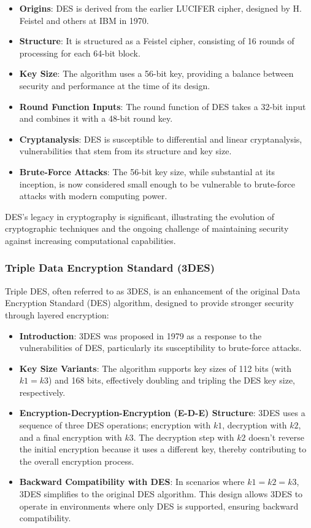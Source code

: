 \documentclass[12pt]{article}
\begin{document}
\begin{itemize}
    \item \textbf{Origins}: DES is derived from the earlier LUCIFER cipher, designed by H. Feistel and others at IBM in 1970.
    \item \textbf{Structure}: It is structured as a Feistel cipher, consisting of 16 rounds of processing for each 64-bit block.
    \item \textbf{Key Size}: The algorithm uses a 56-bit key, providing a balance between security and performance at the time of its design.
    \item \textbf{Round Function Inputs}: The round function of DES takes a 32-bit input and combines it with a 48-bit round key.
    \item \textbf{Cryptanalysis}: DES is susceptible to differential and linear cryptanalysis, vulnerabilities that stem from its structure and key size.
    \item \textbf{Brute-Force Attacks}: The 56-bit key size, while substantial at its inception, is now considered small enough to be vulnerable to brute-force attacks with modern computing power.
\end{itemize}

DES's legacy in cryptography is significant, illustrating the evolution of cryptographic techniques and the ongoing challenge of maintaining security against increasing computational capabilities.

\subsubsection*{Triple Data Encryption Standard (3DES)}

Triple DES, often referred to as 3DES, is an enhancement of the original Data Encryption Standard (DES) algorithm, designed to provide stronger security through layered encryption:

\begin{itemize}
    \item \textbf{Introduction}: 3DES was proposed in 1979 as a response to the vulnerabilities of DES, particularly its susceptibility to brute-force attacks.
    \item \textbf{Key Size Variants}: The algorithm supports key sizes of 112 bits (with \( k1 = k3 \)) and 168 bits, effectively doubling and tripling the DES key size, respectively.
    \item \textbf{Encryption-Decryption-Encryption (E-D-E) Structure}: 3DES uses a sequence of three DES operations; encryption with \( k1 \), decryption with \( k2 \), and a final encryption with \( k3 \). The decryption step with \( k2 \) doesn't reverse the initial encryption because it uses a different key, thereby contributing to the overall encryption process.
    \item \textbf{Backward Compatibility with DES}: In scenarios where \( k1 = k2 = k3 \), 3DES simplifies to the original DES algorithm. This design allows 3DES to operate in environments where only DES is supported, ensuring backward compatibility.
\end{itemize}
\end{document}
